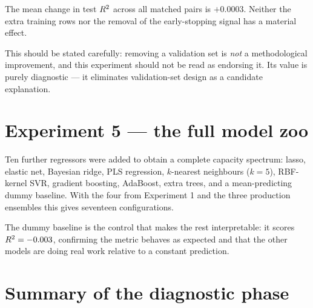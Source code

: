 
\begin{findingbox}[title=Result of Experiment 4]
The mean change in test $R^2$ across all matched pairs is $+0.0003$.
Neither the extra training rows nor the removal of the early-stopping
signal has a material effect.

This should be stated carefully: removing a validation set is \emph{not} a
methodological improvement, and this experiment should not be read as
endorsing it. Its value is purely diagnostic --- it eliminates
validation-set design as a candidate explanation.
\end{findingbox}

\section{Experiment 5 --- the full model zoo}

Ten further regressors were added to obtain a complete capacity spectrum:
lasso, elastic net, Bayesian ridge, PLS regression, $k$-nearest neighbours
($k=5$), RBF-kernel SVR, gradient boosting, AdaBoost, extra trees, and a
mean-predicting dummy baseline. With the four from Experiment 1 and the
three production ensembles this gives seventeen configurations.


The dummy baseline is the control that makes the rest interpretable: it
scores $R^2 = -0.003$, confirming the metric behaves as expected and that
the other models are doing real work relative to a constant prediction.

\section{Summary of the diagnostic phase}

